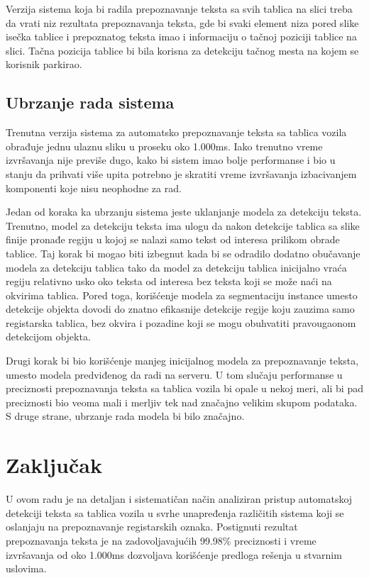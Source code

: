 \documentclass[a4paper,12pt]{article}
\begin{document}
	Verzija sistema koja bi radila prepoznavanje teksta sa svih tablica na slici treba da vrati niz rezultata prepoznavanja teksta, gde bi svaki element niza pored slike isečka tablice i prepoznatog teksta imao i informaciju o tačnoj poziciji tablice na slici. Tačna pozicija tablice bi bila korisna za detekciju tačnog mesta na kojem se korisnik parkirao.
	
	\subsection{Ubrzanje rada sistema}
	
	Trenutna verzija sistema za automatsko prepoznavanje teksta sa tablica vozila obrađuje jednu ulaznu sliku u proseku oko 1.000ms. Iako trenutno vreme izvršavanja nije previše dugo, kako bi sistem imao bolje performanse i bio u stanju da prihvati više upita potrebno je skratiti vreme izvršavanja izbacivanjem komponenti koje nisu neophodne za rad.
	
	Jedan od koraka ka ubrzanju sistema jeste uklanjanje modela za detekciju teksta. Trenutno, model za detekciju teksta ima ulogu da nakon detekcije tablica sa slike finije pronađe regiju u kojoj se nalazi samo tekst od interesa prilikom obrade tablice. Taj korak bi mogao biti izbegnut kada bi se odradilo dodatno obučavanje modela za detekciju tablica tako da model za detekciju tablica inicijalno vraća regiju relativno usko oko teksta od interesa bez teksta koji se može naći na okvirima tablica. Pored toga, korišćenje modela za segmentaciju instance umesto detekcije objekta dovodi do znatno efikasnije detekcije regije koju zauzima samo registarska tablica, bez okvira i pozadine koji se mogu obuhvatiti pravougaonom detekcijom objekta.
	
	Drugi korak bi bio korišćenje manjeg inicijalnog modela za prepoznavanje teksta, umesto modela predviđenog da radi na serveru. U tom slučaju performanse u preciznosti prepoznavanja teksta sa tablica vozila bi opale u nekoj meri, ali bi pad preciznosti bio veoma mali i merljiv tek nad značajno velikim skupom podataka. S druge strane, ubrzanje rada modela bi bilo značajno.
	\newpage
	
	\section{Zaključak}
	
	U ovom radu je na detaljan i sistematičan način analiziran pristup automatskoj detekciji teksta sa tablica vozila u svrhe unapređenja različitih sistema koji se oslanjaju na prepoznavanje registarskih oznaka. Postignuti rezultat prepoznavanja teksta je na zadovoljavajućih 99.98\% preciznosti i vreme izvršavanja od oko 1.000ms dozvoljava korišćenje predloga rešenja u stvarnim uslovima.
	
\end{document}
